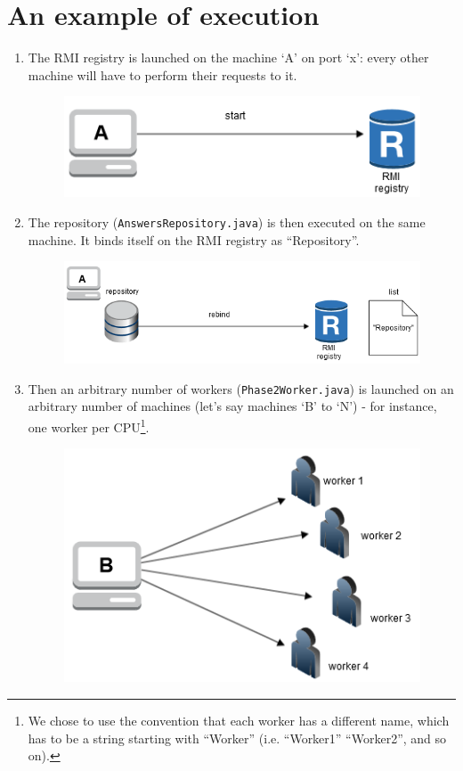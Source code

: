 \documentclass[a4paper, 11pt, oneside]{duthesis}
\begin{document}
\section{An example of execution}\label{example}
\begin{enumerate}

\item The RMI registry is launched on the machine `A' on port `x': every other machine will have to perform their requests to it.

\begin{figure}[htp]
\centering
\includegraphics[scale=.9]{img/DIAG_2.png}
\caption{}
\label{}
\end{figure}

\item The repository (\texttt{AnswersRepository.java}) is then executed on the same machine. It binds itself on the RMI registry as ``Repository''.

\begin{figure}[htp]
\centering
\includegraphics[scale=.9]{img/DIAG_3.png}
\caption{}
\label{}
\end{figure}

\newpage

\item Then an arbitrary number of workers (\texttt{Phase2Worker.java}) is launched on an arbitrary number of machines (let's say machines `B' to `N') - for instance, one worker per CPU\footnote{We chose to use the convention that each worker has a different name, which has to be a string starting with ``Worker'' (i.e. ``Worker1'' ``Worker2'', and so on).}.

\begin{figure}[H]
\centering
\includegraphics[scale=.6]{img/DIAG_4.png}
\caption{}
\label{}
\end{figure}


\end{enumerate}
\end{document}
